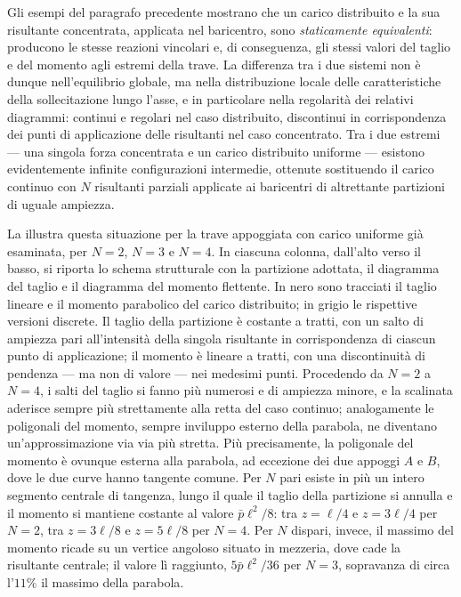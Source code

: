 Gli esempi del paragrafo precedente mostrano che un
carico distribuito e la sua risultante concentrata,
applicata nel baricentro, sono \emph{staticamente
	equivalenti}: producono le stesse reazioni vincolari
e, di conseguenza, gli stessi valori del taglio e del
momento agli estremi della trave. La differenza tra
i due sistemi non è dunque nell'equilibrio globale,
ma nella distribuzione locale delle caratteristiche
della sollecitazione lungo l'asse, e in particolare
nella regolarità dei relativi diagrammi: continui e
regolari nel caso distribuito, discontinui in
corrispondenza dei punti di applicazione delle
risultanti nel caso concentrato. Tra i due estremi
--- una singola forza concentrata e un carico
distribuito uniforme --- esistono evidentemente
infinite configurazioni intermedie, ottenute
sostituendo il carico continuo con $N$ risultanti
parziali applicate ai baricentri di altrettante
partizioni di uguale ampiezza.





La  illustra questa
situazione per la trave appoggiata con carico
uniforme già esaminata, per $N = 2$, $N = 3$ e
$N = 4$. In ciascuna colonna, dall'alto verso il
basso, si riporta lo schema strutturale con la
partizione adottata, il diagramma del taglio e il
diagramma del momento flettente. In nero sono
tracciati il taglio lineare e il momento parabolico
del carico distribuito; in grigio le rispettive
versioni discrete. Il taglio della partizione è
costante a tratti, con un salto di ampiezza pari
all'intensità della singola risultante in
corrispondenza di ciascun punto di applicazione;
il momento è lineare a tratti, con una discontinuità
di pendenza --- ma non di valore --- nei medesimi
punti. Procedendo da $N = 2$ a $N = 4$, i salti
del taglio si fanno più numerosi e di ampiezza
minore, e la scalinata aderisce sempre più
strettamente alla retta del caso continuo;
analogamente le poligonali del momento, sempre inviluppo esterno della parabola, 
ne diventano un'approssimazione via via più stretta. 
Più precisamente, la poligonale del momento è
ovunque esterna alla parabola, ad eccezione dei
due appoggi $A$ e $B$, dove le due curve hanno
tangente comune. Per $N$ pari esiste in più un
intero segmento centrale di tangenza, lungo il
quale il taglio della partizione si annulla e il
momento si mantiene costante al valore
$\bar{p}\ell^2/8$: tra $z = \ell/4$ e $z = 3\ell/4$
per $N=2$, tra $z = 3\ell/8$ e $z = 5\ell/8$ per
$N=4$. Per $N$ dispari, invece, il massimo del
momento ricade su un vertice angoloso situato in
mezzeria, dove cade la risultante centrale; il
valore l\`i raggiunto, $5\bar{p}\ell^2/36$ per
$N=3$, sopravanza di circa l'$11\%$ il massimo
della parabola.

